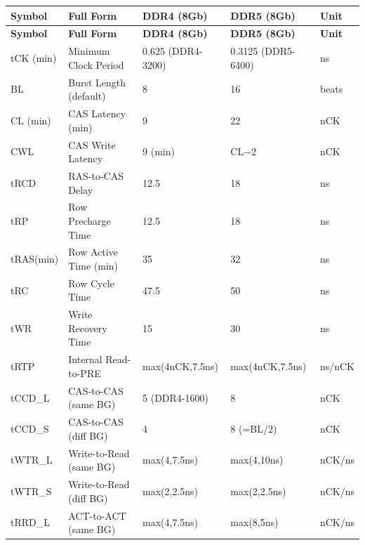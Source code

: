 \documentclass[11pt,a4paper]{article}
\begin{document}
\vspace{0.5em}
{\small
\begin{longtable}{L{2cm} L{5cm} R{2.2cm} R{2.2cm} L{1.5cm}}
\toprule
\textbf{Symbol} & \textbf{Full Form} & \textbf{DDR4 (8Gb)} & \textbf{DDR5 (8Gb)} & \textbf{Unit} \\
\midrule
\endfirsthead
\toprule
\textbf{Symbol} & \textbf{Full Form} & \textbf{DDR4 (8Gb)} & \textbf{DDR5 (8Gb)} & \textbf{Unit} \\
\midrule
\endhead
\bottomrule
\endfoot

tCK (min)  & Minimum Clock Period         & 0.625 (DDR4-3200) & 0.3125 (DDR5-6400) & ns \\
BL         & Burst Length (default)       & 8                 & 16                 & beats \\
CL (min)   & CAS Latency (min)            & 9                 & 22                 & nCK \\
CWL        & CAS Write Latency            & 9 (min)           & CL$-$2             & nCK \\
tRCD       & RAS-to-CAS Delay             & 12.5              & 18                 & ns \\
tRP        & Row Precharge Time           & 12.5              & 18                 & ns \\
tRAS(min)  & Row Active Time (min)        & 35                & 32                 & ns \\
tRC        & Row Cycle Time               & 47.5              & 50                 & ns \\
tWR        & Write Recovery Time          & 15                & 30                 & ns \\
tRTP       & Internal Read-to-PRE         & max(4nCK,7.5ns)   & max(4nCK,7.5ns)    & ns/nCK \\
tCCD\_L    & CAS-to-CAS (same BG)         & 5 (DDR4-1600)     & 8                  & nCK \\
tCCD\_S    & CAS-to-CAS (diff BG)         & 4                 & 8 (=BL/2)          & nCK \\
tWTR\_L    & Write-to-Read (same BG)      & max(4,7.5ns)      & max(4,10ns)        & nCK/ns \\
tWTR\_S    & Write-to-Read (diff BG)      & max(2,2.5ns)      & max(2,2.5ns)       & nCK/ns \\
tRRD\_L    & ACT-to-ACT (same BG)         & max(4,7.5ns)      & max(8,5ns)         & nCK/ns \\

\end{longtable}}
\end{document}
